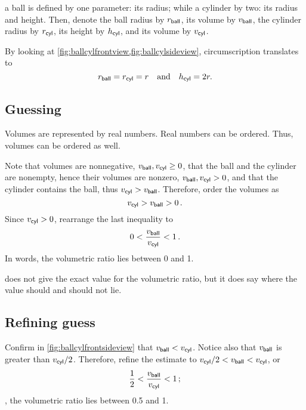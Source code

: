  a ball is defined by one parameter: its radius; while a cylinder by two: its radius and height. Then, denote the ball radius by $r_{\text{\textsf{ball}}}$, its volume by $v_{\text{\textsf{ball}}}$, the cylinder radius by $r_{\text{\textsf{cyl}}}$, its height by $h_{\text{\textsf{cyl}}}$, and its volume by $v_{\text{\textsf{cyl}}}$.

 By looking at \cref{fig:ballcylfrontview,fig:ballcylsideview}, circumscription translates to
%
\begin{equation}\label{eq:volumetricratioconstraint}
  r_{\text{\textsf{ball}}} = r_{\text{\textsf{cyl}}} = r\quad\text{and}\quad h_{\text{\textsf{cyl}}} = 2r.
\end{equation}



\subsection{Guessing} %
\label{sub:guessing}
%
 Volumes are represented by real numbers. Real numbers can be ordered. Thus, volumes can be ordered as well. 

 Note that volumes are nonnegative, $v_{\text{\textsf{ball}}},v_{\text{\textsf{cyl}}}\geq 0$, that the ball and the cylinder are nonempty, hence their volumes are nonzero, $v_{\text{\textsf{ball}}},v_{\text{\textsf{cyl}}} > 0$, and that the cylinder contains the ball, thus $v_{\text{\textsf{cyl}}} > v_{\text{\textsf{ball}}}$. Therefore, order the volumes as 
%
\begin{equation*}
  v_{\text{\textsf{cyl}}} > v_{\text{\textsf{ball}}} > 0\,.
\end{equation*}
%
 Since $v_{\text{\textsf{cyl}}} > 0$, rearrange the last inequality to
%
\begin{equation}\label{eq:guesstimate}
  0 < \dfrac{v_{\text{\textsf{ball}}}}{v_{\text{\textsf{cyl}}}} < 1\,.
\end{equation}
%
 In words, the volumetric ratio lies between 0 and 1. 

  does not give the exact value for the volumetric ratio, but it does say where the value should and should not lie.



\subsection{Refining guess} %
\label{sub:refining_guess}
%
 Confirm in \cref{fig:ballcylfrontsideview} that $v_{\text{\textsf{ball}}} < v_{\text{\textsf{cyl}}}$. Notice also that $v_{\text{\textsf{ball}}}$ is greater than $v_{\text{\textsf{cyl}}}/2$. Therefore, refine the estimate to $v_{\text{\textsf{cyl}}}/2 < v_{\text{\textsf{ball}}} < v_{\text{\textsf{cyl}}}$, or
%
\begin{equation}\label{eq:firstestimate}
  \dfrac 12 < \dfrac{v_{\text{\textsf{ball}}}}{v_{\text{\textsf{cyl}}}} < 1\,;
\end{equation}
%
\ie, the volumetric ratio lies between 0.5 and 1.

